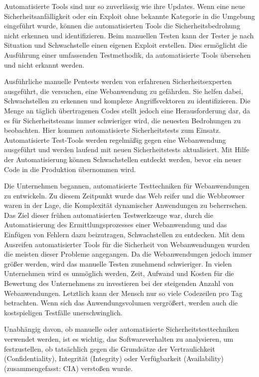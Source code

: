 Automatisierte Tools sind nur so zuverlässig wie ihre Updates. Wenn eine neue Sicherheitsanfälligkeit oder ein Exploit ohne bekannte Kategorie in die Umgebung eingeführt wurde, können die automatisierten Tools die Sicherheitsbedrohung nicht erkennen und identifizieren. Beim manuellen Testen kann der Tester je nach Situation und Schwachstelle einen eigenen Exploit erstellen. Dies ermöglicht die Ausführung einer umfassenden Testmethodik, da automatisierte Tools übersehen und nicht erkannt werden\cite{packetlabs18}.

Ausführliche manuelle Pentests werden von erfahrenen Sicherheitsexperten ausgeführt, die versuchen, eine Webanwendung zu gefährden. Sie helfen dabei, Schwachstellen zu erkennen und komplexe Angriffsvektoren zu identifizieren. Die Menge an täglich übertragenen Codes stellt jedoch eine Herausforderung dar, da es für Sicherheitsteams immer schwieriger wird, die neuesten Bedrohungen zu beobachten. Hier kommen automatisierte Sicherheitstests zum Einsatz. Automatisierte Test-Tools werden regelmäßig gegen eine Webanwendung ausgeführt und werden laufend mit neuen Sicherheitstests aktualisiert. Mit Hilfe der Automatisierung können Schwachstellen entdeckt werden, bevor ein neuer Code in die Produktion übernommen wird\cite{wmpta17}.

Die Unternehmen begannen, automatisierte Testtechniken für Webanwendungen zu entwickeln. Zu diesem Zeitpunkt wurde das Web reifer und die Webbrowser waren in der Lage, die Komplexität dynamischer Anwendungen zu beherrschen. Das Ziel dieser frühen automatisierten Testwerkzeuge war, durch die Automatisierung des Ermittlungsprozesses einer Webanwendung und das Einfügen von Fehlern dazu beizutragen, Schwachstellen zu entdecken. Mit dem Ausreifen automatisierter Tools für die Sicherheit von Webanwendungen wurden die meisten dieser Probleme angegangen. Da die Webanwendungen jedoch immer größer werden, wird das manuelle Testen zunehmend schwieriger. In vielen Unternehmen wird es unmöglich werden, Zeit, Aufwand und Kosten für die Bewertung des Unternehmens zu investieren bei der steigenden Anzahl von Webanwendungen. Letztlich kann der Mensch nur so viele Codezeilen pro Tag betrachten. Wenn sich das Anwendungsvolumen vergrößert, werden auch die kostspieligen Testfälle unerschwinglich\cite[2--5]{wasasibm08}.

Unabhängig davon, ob manuelle oder automatisierte Sicherheitstesttechniken verwendet werden, ist es wichtig, das Softwareverhalten zu analysieren, um festzustellen, ob tatsächlich gegen die Grundsätze der Vertraulichkeit (Confidentiality), Integrität (Integrity) oder Verfügbarkeit (Availability) (zusammengefasst: CIA) verstoßen wurde\cite{moaast17}.











